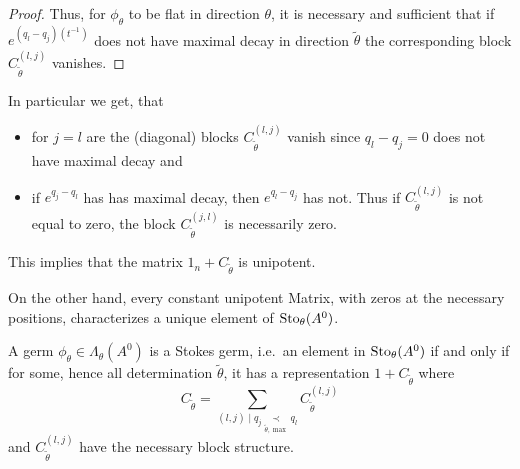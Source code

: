 \begin{proof}
\begin{comment}
    \begin{align*}
      \phi_\theta(t)
      &=t^Le^{Q(t^{-1})}\left(
        1_n+C_{\tilde\theta}
      \right)e^{-Q(t^{-1})}t^{-L}
    \\&=t^Le^{Q(t^{-1})}\left(
        1_n+\sum_{(l,j)}C_{\tilde\theta}^{(l,j)}
      \right)e^{-Q(t^{-1})}t^{-L}
    \\&=t^L\left(
        1_n+\sum_{(l,j)}e^{Q(t^{-1})}C_{\tilde\theta}^{(l,j)}e^{-Q(t^{-1})}
      \right)t^{-L}
    \\&=t^L\left(
          1_n+\sum_{(l,j)}C_{\tilde\theta}^{(l,j)}e^{(q_l-q_j)(t^{-1})}
        \right)t^{-L} \,.
    \end{align*}
  \end{comment}
  Thus, for $\phi_{\theta}$ to be flat in direction $\theta$, it is
  necessary and sufficient that if $e^{(q_l-q_j)(t^{-1})}$ does not have
  maximal decay in direction $\tilde\theta$ the corresponding
  block $C_{\tilde\theta}^{(l,j)}$ vanishes.

\end{proof}

In particular we get, that
\begin{itemize}
  \item for $j=l$ are the (diagonal) blocks $C_{\tilde\theta}^{(l,j)}$ vanish
    since $q_l-q_j=0$ does not have maximal decay and
  \item if $e^{q_j-q_l}$ has has maximal decay, then $e^{q_l-q_j}$ has not.
    Thus if $C_{\tilde\theta}^{(l,j)}$ is not equal to zero, the block
    $C_{\tilde\theta}^{(j,l)}$ is necessarily zero.
\end{itemize}
\begin{rem}
  This implies that the matrix $1_n+C_{\tilde\theta}$ is unipotent.
\end{rem}
On the other hand, every constant unipotent Matrix, with zeros at the necessary
positions, characterizes a unique element of $\operatorname{Sto}_\theta(A^0)$.

\begin{lem}
  A germ $\phi_\theta\in\Lambda_\theta(A^0)$ is a Stokes germ, i.e.\ an element
  in $\operatorname{Sto}_\theta(A^0)$ if and only if for some, hence all determination
  $\tilde\theta$, it has a representation $1+C_{\tilde\theta}$ where
  \[
    C_{\tilde\theta}=\sum_{(l,j)\mid q_j\underset{\tilde\theta,\max}{\prec}q_l}
    C_{\tilde\theta}^{(l,j)}
  \]
  and $C_{\tilde\theta}^{(l,j)}$ have the necessary block structure.
\end{lem}

